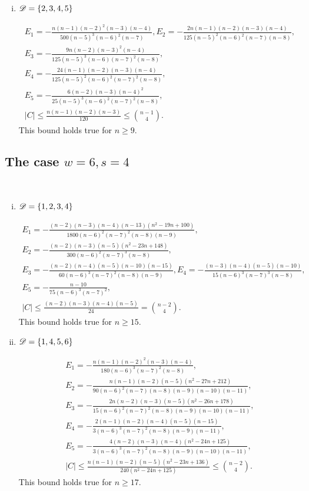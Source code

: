 \documentclass{amsart}
\begin{document}
{\begin{enumerate}[(i)]
\item $\mathscr{D}=\{2,3,4,5\}$

\begin{gather*}
E_1=-\frac{n(n-1)(n-2)^2(n-3)(n-4)}{500(n-5)^3(n-6)^2(n-7)}, E_2=-\frac{2n(n-1)(n-2)(n-3)(n-4)}{125(n-5)^2(n-6)^2(n-7)(n-8)},\\ 
E_3=-\frac{9n(n-2)(n-3)^2(n-4)}{125(n-5)^3(n-6)(n-7)^2(n-8)},\\
E_4=-\frac{24(n-1)(n-2)(n-3)(n-4)}{125(n-5)^2(n-6)^2(n-7)^2(n-8)},\\
E_5=-\frac{6(n-2)(n-3)(n-4)^2}{25(n-5)^3(n-6)^2(n-7)^2(n-8)},\\
|C|\le \frac{n(n-1)(n-2)(n-3)}{120}\leq \binom{n-1}{4}.
\end{gather*}
This bound holds true for $n\ge 9.$

\end{enumerate}

\subsection{The case \texorpdfstring{$w=6,s=4$}.}  \label{App:6,4}\hfill\\
\begin{enumerate}[(i)]
\item $\mathscr{D}=\{1,2,3,4\}$

\begin{gather*}
E_1=-\frac{(n-2)(n-3)(n-4)(n-13)\left(n^2-19n+100\right)}{1800(n-6)^2(n-7)^2(n-8)(n-9)},\\ E_2=-\frac{(n-2)(n-3)(n-5)\left(n^2-23n+148\right)}{300(n-6)^2(n-7)^3(n-8)},\\ 
E_3=-\frac{(n-2)(n-4)(n-5)(n-10)(n-15)}{60(n-6)^3(n-7)^2(n-8)(n-9)},
E_4=-\frac{(n-3)(n-4)(n-5)(n-10)}{15(n-6)^3(n-7)^3(n-8)},\\
E_5=-\frac{n-10}{75(n-6)^3(n-7)^2},\\
|C|\le \frac{(n-2)(n-3)(n-4)(n-5)}{24}= \binom{n-2}{4}.
\end{gather*}
This bound holds true for $n\ge 15.$

\item $\mathscr{D} = \{1,4,5,6\}$

\begin{gather*}
E_1=-\frac{n(n-1)(n-2)^2(n-3)(n-4)}{180(n-6)^3(n-7)^2(n-8)},\\ E_2=-\frac{n(n-1)(n-2)(n-5)\left(n^2-27n+212\right)}{90(n-6)^2(n-7)(n-8)(n-9)(n-10)(n-11)},\\ 
E_3=-\frac{2n(n-2)(n-3)(n-5)\left(n^2-26n+178\right)}{15(n-6)^2(n-7)^2(n-8)(n-9)(n-10)(n-11)},\\
E_4=-\frac{2(n-1)(n-2)(n-4)(n-5)(n-15)}{3(n-6)^3(n-7)^2(n-8)(n-9)(n-11)},\\
E_5=-\frac{4(n-2)(n-3)(n-4)\left(n^2-24n+125\right)}{3(n-6)^3(n-7)^2(n-8)(n-9)(n-10)(n-11)},\\
|C|\le \frac{n(n-1)(n-2)(n-5)\left(n^2-23n+136\right)}{240\left(n^2-24n+125\right)} \leq \binom{n-2}{4}.
\end{gather*}
This bound holds true for $n\ge 17.$


\end{enumerate}}
\end{document}
